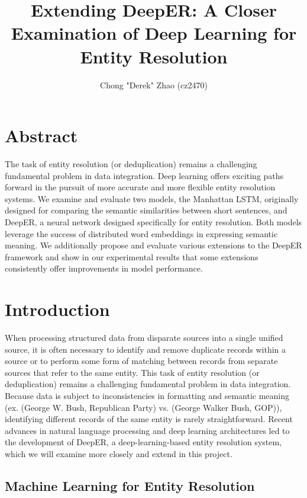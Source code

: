 \documentclass{proc}
\begin{document}
\title{Extending DeepER: A Closer Examination of Deep Learning for Entity Resolution}

\author{Chong "Derek" Zhao (cz2470)}

\maketitle

\section{Abstract}

The task of entity resolution (or deduplication) remains a challenging fundamental problem in data integration. Deep learning offers exciting paths forward in the pursuit of more accurate and more flexible entity resolution systems. We examine and evaluate two models, the Manhattan LSTM, originally designed for comparing the semantic similarities between short sentences, and DeepER, a neural network designed specifically for entity resolution. Both models leverage the success of distributed word embeddings in expressing semantic meaning. We additionally propose and evaluate various extensions to the DeepER framework and show in our experimental results that some extensions consistently offer improvements in model performance.

\section{Introduction}

When processing structured data from disparate sources into a single unified source, it is often necessary to identify and remove duplicate records within a source or to perform some form of matching between records from separate sources that refer to the same entity. This task of entity resolution (or deduplication) remains a challenging fundamental problem in data integration. Because data is subject to inconsistencies in formatting and semantic meaning (ex. (George W. Bush, Republican Party) vs. (George Walker Bush, GOP)), identifying different records of the same entity is rarely straightforward. Recent advances in natural language processing and deep learning architectures led to the development of DeepER, a deep-learning-based entity resolution system, which we will examine more closely and extend in this project.

\subsection{Machine Learning for Entity Resolution}
\end{document}
